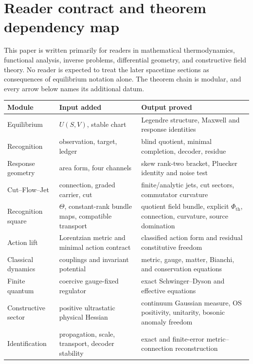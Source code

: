 \section{Reader contract and theorem dependency map}
\label{sec:reader-contract}

This paper is written primarily for readers in mathematical thermodynamics, functional analysis, inverse problems, differential geometry, and constructive field theory.  No reader is expected to treat the later spacetime sections as consequences of equilibrium notation alone.  The theorem chain is modular, and every arrow below names its additional datum.

\begin{center}
\small
\begin{tabular}{p{}p{}p{}}
\toprule
Module & Input added & Output proved\\
\midrule
Equilibrium & $U(S,V)$, stable chart & Legendre structure, Maxwell and response identities\\
Recognition & observation, target, ledger & blind quotient, minimal completion, decoder, residue\\
Response geometry & area form, four channels & skew rank-two bracket, Pluecker identity and noise test\\
Cut--Flow--Jet & connection, graded carrier, cut & finite/analytic jets, cut sectors, commutator curvature\\
Recognition square & $\Theta$, constant-rank bundle maps, compatible transport & quotient field bundle, explicit $\Phi_{\mathrm{th}}$, connection, curvature, source domination\\
Action lift & Lorentzian metric and minimal action contract & classified action form and residual constitutive freedom\\
Classical dynamics & couplings and invariant potential & metric, gauge, matter, Bianchi, and conservation equations\\
Finite quantum & coercive gauge-fixed regulator & exact Schwinger--Dyson and effective equations\\
Constructive sector & positive ultrastatic physical Hessian & continuum Gaussian measure, OS positivity, unitarity, bosonic anomaly freedom\\
Identification & propagation, scale, transport, decoder stability & exact and finite-error metric--connection reconstruction\\
\bottomrule
\end{tabular}
\end{center}

